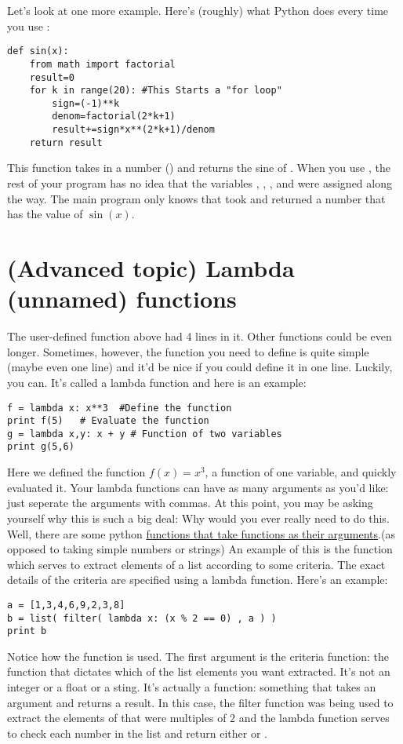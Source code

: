 Let's look at one more example.  Here's (roughly) what Python does every time you use :
\begin{Verbatim}
def sin(x):
    from math import factorial
    result=0
    for k in range(20): #This Starts a "for loop"
        sign=(-1)**k
        denom=factorial(2*k+1)
        result+=sign*x**(2*k+1)/denom
    return result
\end{Verbatim}
This function takes in a number () and returns the sine of .  When you use , the rest of your program has no idea that the variables , , , and  were assigned along the way.  The main program only knows that  took  and returned a number that has the value of $\sin(x)$.


\section{(Advanced topic) Lambda (unnamed) functions}
The user-defined function  above had 4 lines in it.  Other functions
could be even longer.  Sometimes, however, the function you need to
define is quite simple (maybe even one line) and it'd be nice if you
could define it in one line.  Luckily, you can.  It's
called a lambda function and here is an example:
\begin{Verbatim}
f = lambda x: x**3  #Define the function
print f(5)   # Evaluate the function
g = lambda x,y: x + y # Function of two variables
print g(5,6)
\end{Verbatim}
Here we defined the function $f(x) = x^3$, a function of one variable,
and quickly evaluated it.  Your lambda functions can have as many
arguments as you'd like: just seperate the arguments with commas.  At
this point, you may be asking yourself why this is such a big deal:
Why would you ever really need to do this.  Well, there are some
python \underline{functions that take functions as their
  arguments}.(as opposed
to taking simple numbers or strings) An example of this is the
 function which serves to extract elements of a list
according to some criteria.  The exact details of the criteria are
specified using a lambda function.  Here's an example:
\begin{Verbatim}
a = [1,3,4,6,9,2,3,8]
b = list( filter( lambda x: (x % 2 == 0) , a ) )
print b
\end{Verbatim}
Notice how the  function is used.  The first argument
is the criteria function: the function that dictates which of the list
elements you want extracted. It's not an integer or a float or a
sting.  It's actually a function: something that takes an argument and
returns a result.  In this case, the filter function was being used to
extract the elements of  that were multiples of $2$ and the
lambda function serves to check each number in the list and return
either  or .


